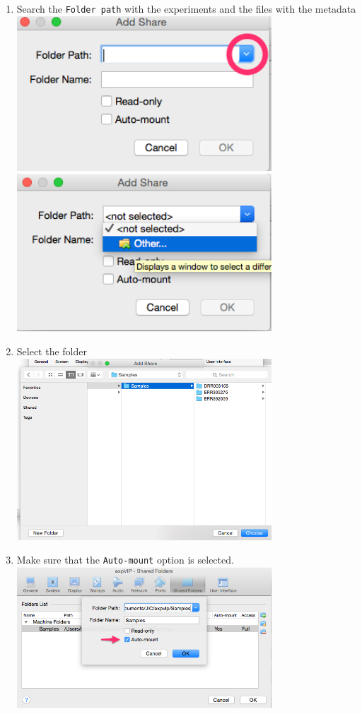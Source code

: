 \begin{enumerate}
\item
  Search the \lstinline!Folder path! with the experiments and the files
  with the metadata \\ \includegraphics[width=0.75\textwidth]{expVIP/tutorial/images/Shared_Folder04.png}
  \\ \includegraphics[width=0.75\textwidth]{expVIP/tutorial/images/Shared_Folder05.png}
\item
  Select the folder \\ \includegraphics[width=0.75\textwidth]{expVIP/tutorial/images/Shared_Folder06.png}
\item
  Make sure that the \lstinline!Auto-mount! option is selected.
  \\ \includegraphics[width=0.75\textwidth]{expVIP/tutorial/images/Shared_Folder07.png}

\end{enumerate}
